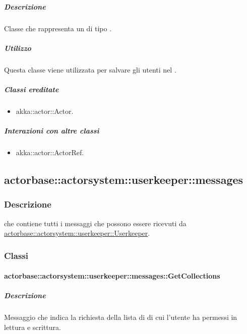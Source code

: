 \documentclass{scalatekids-article}
\begin{document}
\subparagraph{Descrizione}

Classe che rappresenta un  di tipo .

\subparagraph{Utilizzo}

Questa classe viene utilizzata per salvare gli utenti nel .

\subparagraph{Classi ereditate}

\begin{itemize}

\item akka::actor::Actor.

\end{itemize}

\subparagraph{Interazioni con altre classi}

\begin{itemize}
\item akka::actor::ActorRef.
\end{itemize}

\subsection{actorbase::actorsystem::userkeeper::messages}
\label{sec:actorbase::actorsystem::userkeeper::messages}

\subsubsection{Descrizione}

 che contiene tutti i messaggi che possono essere ricevuti da
\hyperref[sec:actorbase::actorsystem::userkeeper::Userkeeper]{actorbase::actorsystem::userkeeper::Userkeeper}.

\subsubsection{Classi}

\paragraph{actorbase::actorsystem::userkeeper::messages::GetCollections}
\label{sec:actorbase::actorsystem::userkeeper::messages::GetCollections}

\subparagraph{Descrizione}

Messaggio che indica la richiesta della lista di  di cui
l'utente ha  permessi in lettura e scrittura.
\end{document}
